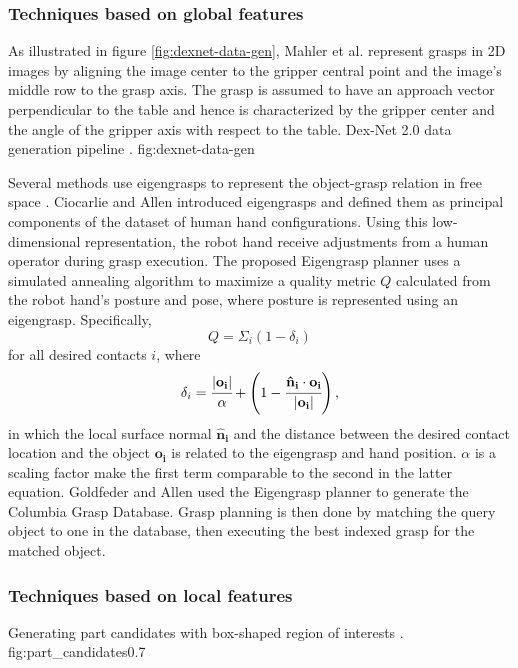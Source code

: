 \subsubsection*{Techniques based on global features}
As illustrated in figure \ref{fig:dexnet-data-gen}, Mahler et al. \cite{mahler2017} represent grasps in 2D images by
aligning the image center to the gripper central point and the image's middle row to the grasp axis. The grasp is
assumed to have an approach vector perpendicular to the table and hence is characterized by the gripper center and the
angle of the gripper axis with respect to the table.
             {Dex-Net 2.0 data generation pipeline \cite{mahler2017}.}
             {fig:dexnet-data-gen}{\textwidth}

Several methods use eigengrasps to represent the object-grasp relation in free space \cite{Goldfeder2011,Ciocarlie2009}.
Ciocarlie and Allen \cite{Ciocarlie2009} introduced eigengrasps and defined them as principal components of the dataset
of human hand configurations. Using this low-dimensional representation, the robot hand receive adjustments from a human
operator during grasp execution. The proposed Eigengrasp planner uses a simulated annealing algorithm to maximize a
quality metric $Q$ calculated from the robot hand's posture and pose, where posture is represented using an eigengrasp.
Specifically,
\[ Q = \Sigma_i (1 - \delta_i) \]
for all desired contacts $i$, where
\[ \delta_i = \cfrac{|\mathbf{o_i}|}{\alpha}
+ \left(1 - \cfrac{\mathbf{\hat{n}_i} \cdot \mathbf{o_i}}{|\mathbf{o_i}|} \right), \]
in which the local surface normal $\mathbf{\hat{n}_i}$ and the distance between the desired contact location and the
object $\mathbf{o_i}$ is related to the eigengrasp and hand position. $\alpha$ is a scaling factor make the first term
comparable to the second in the latter equation. Goldfeder and Allen \cite{Goldfeder2011} used the Eigengrasp planner
to generate the Columbia Grasp Database. Grasp planning is then done by matching the query object to one in the
database, then executing the best indexed grasp for the matched object.

\subsubsection*{Techniques based on local features} \label{subsub:object_grasp_local}

             {Generating part candidates with box-shaped region of interests \cite{Detry2012}.}
             {fig:part_candidates}{0.7\textwidth}

